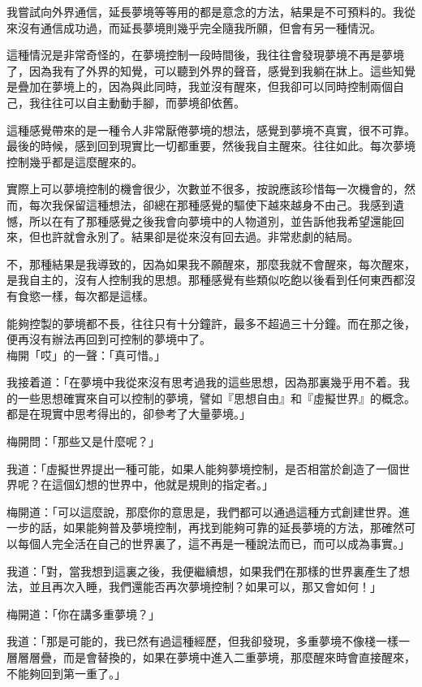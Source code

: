 我嘗試向外界通信，延長夢境等等用的都是意念的方法，結果是不可預料的。我從來沒有通信成功過，而延長夢境則幾乎完全隨我所願，但會有另一種情況。

這種情況是非常奇怪的，在夢境控制一段時間後，我往往會發現夢境不再是夢境了，因為我有了外界的知覺，可以聽到外界的聲音，感覺到我躺在牀上。這些知覺是疊加在夢境上的，因為與此同時，我並沒有醒來，但我卻可以同時控制兩個自己，我往往可以自主動動手腳，而夢境卻依舊。

這種感覺帶來的是一種令人非常厭倦夢境的想法，感覺到夢境不真實，很不可靠。最後的時候，感到回到現實比一切都重要，然後我自主醒來。往往如此。每次夢境控制幾乎都是這麼醒來的。

實際上可以夢境控制的機會很少，次數並不很多，按說應該珍惜每一次機會的，然而，每次我保留這種想法，卻總在那種感覺的驅使下越來越身不由己。我感到遺憾，所以在有了那種感覺之後我會向夢境中的人物道別，並告訴他我希望還能回來，但也許就會永別了。結果卻是從來沒有回去過。非常悲劇的結局。

不，那種結果是我導致的，因為如果我不願醒來，那麼我就不會醒來，每次醒來，是我自主的，沒有人控制我的思想。那種感覺有些類似吃飽以後看到任何東西都沒有食慾一樣，每次都是這樣。

能夠控製的夢境都不長，往往只有十分鐘許，最多不超過三十分鐘。而在那之後，便再沒有辦法再回到可控制的夢境中了。
\\


梅開「哎」的一聲：「真可惜。」

我接着道：「在夢境中我從來沒有思考過我的這些思想，因為那裏幾乎用不着。我的一些思想確實來自可以控制的夢境，譬如『思想自由』和『虛擬世界』的概念。都是在現實中思考得出的，卻參考了大量夢境。」

梅開問：「那些又是什麼呢？」

我道：「虛擬世界提出一種可能，如果人能夠夢境控制，是否相當於創造了一個世界呢？在這個幻想的世界中，他就是規則的指定者。」

梅開道：「可以這麼說，那麼你的意思是，我們都可以通過這種方式創建世界。進一步的話，如果能夠普及夢境控制，再找到能夠可靠的延長夢境的方法，那確然可以每個人完全活在自己的世界裏了，這不再是一種說法而已，而可以成為事實。」

我道：「對，當我想到這裏之後，我便繼續想，如果我們在那樣的世界裏產生了想法，並且再次入睡，我們還能否再次夢境控制？如果可以，那又會如何！」

梅開道：「你在講多重夢境？」

我道：「那是可能的，我已然有過這種經歷，但我卻發現，多重夢境不像棧一樣一層層層疊，而是會替換的，如果在夢境中進入二重夢境，那麼醒來時會直接醒來，不能夠回到第一重了。」

